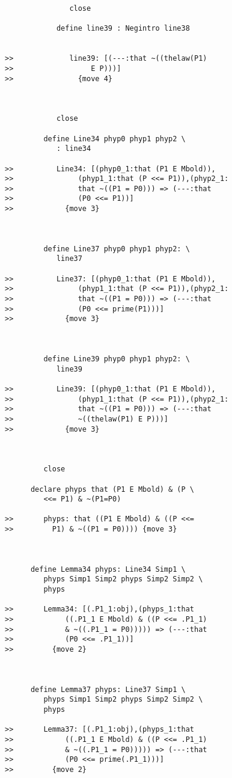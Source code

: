 \documentclass[12pt]{article}
\begin{document}
\begin{verbatim}
               close

            define line39 : Negintro line38


>>             line39: [(---:that ~((thelaw(P1)
>>                  E P)))]
>>               {move 4}



            close

         define Line34 phyp0 phyp1 phyp2 \
            : line34

>>          Line34: [(phyp0_1:that (P1 E Mbold)),
>>               (phyp1_1:that (P <<= P1)),(phyp2_1:
>>               that ~((P1 = P0))) => (---:that
>>               (P0 <<= P1))]
>>            {move 3}



         define Line37 phyp0 phyp1 phyp2: \
            line37

>>          Line37: [(phyp0_1:that (P1 E Mbold)),
>>               (phyp1_1:that (P <<= P1)),(phyp2_1:
>>               that ~((P1 = P0))) => (---:that
>>               (P0 <<= prime(P1)))]
>>            {move 3}



         define Line39 phyp0 phyp1 phyp2: \
            line39

>>          Line39: [(phyp0_1:that (P1 E Mbold)),
>>               (phyp1_1:that (P <<= P1)),(phyp2_1:
>>               that ~((P1 = P0))) => (---:that
>>               ~((thelaw(P1) E P)))]
>>            {move 3}



         close

      declare phyps that (P1 E Mbold) & (P \
         <<= P1) & ~(P1=P0)

>>       phyps: that ((P1 E Mbold) & ((P <<=
>>         P1) & ~((P1 = P0)))) {move 3}



      define Lemma34 phyps: Line34 Simp1 \
         phyps Simp1 Simp2 phyps Simp2 Simp2 \
         phyps

>>       Lemma34: [(.P1_1:obj),(phyps_1:that
>>            ((.P1_1 E Mbold) & ((P <<= .P1_1)
>>            & ~((.P1_1 = P0))))) => (---:that
>>            (P0 <<= .P1_1))]
>>         {move 2}



      define Lemma37 phyps: Line37 Simp1 \
         phyps Simp1 Simp2 phyps Simp2 Simp2 \
         phyps

>>       Lemma37: [(.P1_1:obj),(phyps_1:that
>>            ((.P1_1 E Mbold) & ((P <<= .P1_1)
>>            & ~((.P1_1 = P0))))) => (---:that
>>            (P0 <<= prime(.P1_1)))]
>>         {move 2}




\end{verbatim}
\end{document}
